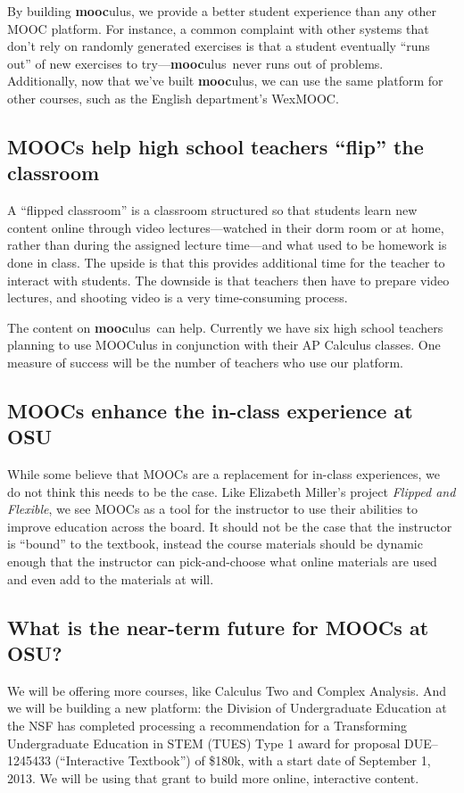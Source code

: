 \documentclass[12pt]{amsart}
\newcommand{\mooculus}{\textsf{\textbf{mooc}ulus}}
\begin{document}
By building \mooculus, we provide a better student experience than any
other MOOC platform.  For instance, a common complaint with other
systems that don't rely on randomly generated exercises is that a
student eventually ``runs out'' of new exercises to try---\mooculus\
never runs out of problems.  Additionally, now that we've built
\mooculus, we can use the same platform for other courses, such as the
English department's WexMOOC.

\subsection*{MOOCs help high school teachers ``flip'' the classroom}

A ``flipped classroom'' is a classroom structured so that students
learn new content online through video lectures---watched in their
dorm room or at home, rather than during the assigned lecture
time---and what used to be homework is done in class.  The upside is
that this provides additional time for the teacher to interact with
students.  The downside is that teachers then have to prepare video
lectures, and shooting video is a very time-consuming process.

The content on \mooculus\ can help.  Currently we have six high school
teachers planning to use MOOCulus in conjunction with their AP
Calculus classes.  One measure of success will be the number of
teachers who use our platform.

\subsection*{MOOCs enhance the in-class experience at OSU}

While some believe that MOOCs are a replacement for in-class experiences, we do
not think this needs to be the case. Like Elizabeth Miller's project
\textit{Flipped and Flexible}, we see MOOCs as a tool for the
instructor to use their abilities to improve education across the
board. It should not be the case that the instructor is ``bound'' to
the textbook, instead the course materials should be dynamic enough
that the instructor can pick-and-choose what online materials are used
and even add to the materials at will.

\subsection*{What is the near-term future for MOOCs at OSU?}

We will be offering more courses, like Calculus Two and Complex
Analysis.  And we will be building a new platform: the Division of
Undergraduate Education at the NSF has completed processing a
recommendation for a Transforming Undergraduate Education in STEM
(TUES) Type 1 award for proposal DUE--1245433 (``Interactive
Textbook'') of \$180k, with a start date of September 1, 2013.  We
will be using that grant to build more online, interactive content.
\end{document}
